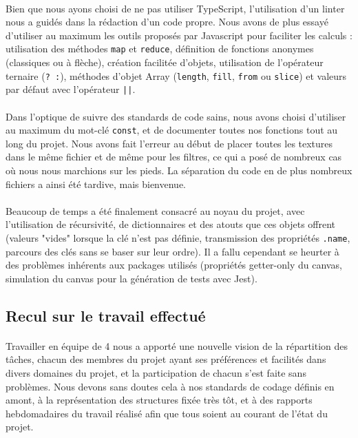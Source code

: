 \documentclass[a4paper]{article}
\begin{document}
\paragraph{}
Bien que nous ayons choisi de ne pas utiliser TypeScript, l'utilisation d'un linter nous a guidés dans la rédaction d'un code propre. Nous avons de plus essayé d'utiliser au maximum les outils proposés par Javascript pour faciliter les calculs : utilisation des méthodes \texttt{map} et \texttt{reduce}, définition de fonctions anonymes (classiques ou à flèche), création facilitée d'objets, utilisation de l'opérateur ternaire (\texttt{? :}), méthodes d'objet Array (\texttt{length}, \texttt{fill}, \texttt{from} ou \texttt{slice}) et valeurs par défaut avec l'opérateur \texttt{||}.

\paragraph{}
Dans l'optique de suivre des standards de code sains, nous avons choisi d'utiliser au maximum du mot-clé \texttt{const}, et de documenter toutes nos fonctions tout au long du projet. Nous avons fait l'erreur au début de placer toutes les textures dans le même fichier et de même pour les filtres, ce qui a posé de nombreux cas où nous nous marchions sur les pieds. La séparation du code en de plus nombreux fichiers a ainsi été tardive, mais bienvenue.

\paragraph{}
Beaucoup de temps a été finalement consacré au noyau du projet, avec l'utilisation de récursivité, de dictionnaires et des atouts que ces objets offrent (valeurs "vides" lorsque la clé n'est pas définie, transmission des propriétés \texttt{.name}, parcours des clés sans se baser sur leur ordre). Il a fallu cependant se heurter à des problèmes inhérents aux packages utilisés (propriétés getter-only du canvas, simulation du canvas pour la génération de tests avec Jest).



\subsection{Recul sur le travail effectué}
\label{sec:conclu}

\paragraph{}
Travailler en équipe de 4 nous a apporté une nouvelle vision de la répartition des tâches, chacun des membres du projet ayant ses préférences et facilités dans divers domaines du projet, et la participation de chacun s'est faite sans problèmes. Nous devons sans doutes cela à nos standards de codage définis en amont, à la représentation des structures fixée très tôt, et à des rapports hebdomadaires du travail réalisé afin que tous soient au courant de l'état du projet.
\end{document}
